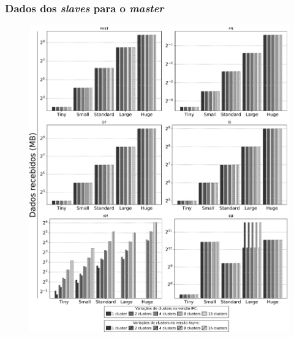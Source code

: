 \documentclass[xcolor={table}]{beamer}
\begin{document}
\begin{frame}\frametitle{Dados dos \textit{slaves} para o \textit{master}}
    \begin{figure}[h]
      \centering
      \label{fig:datareceived}
      \includegraphics[width=.65\linewidth, keepaspectratio]{figs/data_received.pdf}
    \end{figure}
\end{frame}
\end{document}
